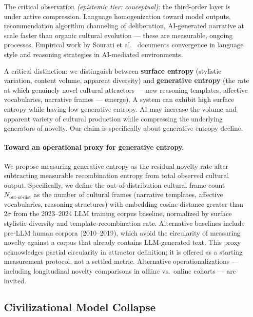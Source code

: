 \documentclass[11pt, a4paper]{article}
\theoremstyle{remark}
\begin{document}
The critical observation \textit{(epistemic tier: conceptual)}: the third-order layer is under active compression. Language homogenization toward model outputs, recommendation algorithm channeling of deliberation, AI-generated narrative at scale faster than organic cultural evolution --- these are measurable, ongoing processes. Empirical work by Sourati et al.~\cite{sourati2026} documents convergence in language style and reasoning strategies in AI-mediated environments.

A critical distinction: we distinguish between \textbf{surface entropy} (stylistic variation, content volume, apparent diversity) and \textbf{generative entropy} (the rate at which genuinely novel cultural attractors --- new reasoning templates, affective vocabularies, narrative frames --- emerge). A system can exhibit high surface entropy while having low generative entropy. AI may increase the volume and apparent variety of cultural production while compressing the underlying generators of novelty. Our claim is specifically about generative entropy decline.

\paragraph{Toward an operational proxy for generative entropy.} We propose measuring generative entropy as the residual novelty rate after subtracting measurable recombination entropy from total observed cultural output. Specifically, we define the out-of-distribution cultural frame count $N_{\text{out-of-dist}}$ as the number of cultural frames (narrative templates, affective vocabularies, reasoning structures) with embedding cosine distance greater than $2\sigma$ from the 2023--2024 LLM training corpus baseline, normalized by surface stylistic diversity and template-recombination rate. Alternative baselines include pre-LLM human corpora (2010--2019), which avoid the circularity of measuring novelty against a corpus that already contains LLM-generated text.
This proxy acknowledges partial circularity in attractor definition; it is offered as a starting measurement protocol, not a settled metric. Alternative operationalizations --- including longitudinal novelty comparisons in offline vs.\ online cohorts --- are invited.

\subsection{Civilizational Model Collapse}\label{sec:cmc}
\end{document}
